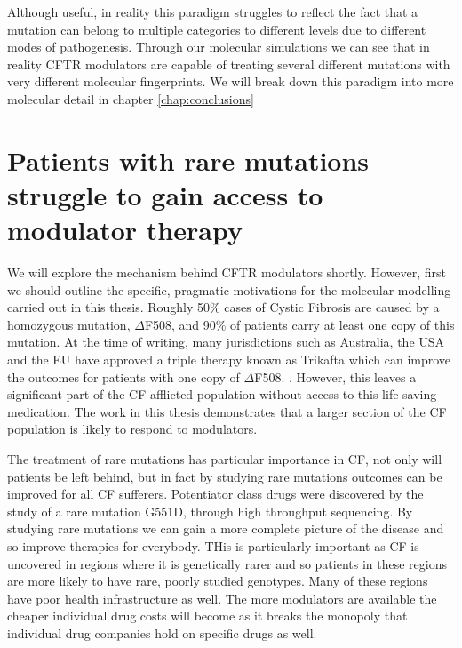 Although useful, in reality this paradigm struggles to reflect the fact that a mutation can belong to multiple categories to different levels due to different modes of pathogenesis. Through our molecular simulations we can see that in reality CFTR modulators are capable of treating several different mutations with very different molecular fingerprints. We will break down this paradigm into more molecular detail in chapter \ref{chap:conclusions}


\section{Patients with rare mutations struggle to gain access to modulator therapy}
We will explore the mechanism behind CFTR modulators shortly. However, first we should outline the specific, pragmatic motivations for the molecular modelling carried out in this thesis. Roughly 50\% cases of Cystic Fibrosis are caused by a homozygous mutation, $\Delta$F508, and 90\% of patients carry at least one copy of this mutation. At the time of writing, many jurisdictions such as Australia, the USA and the EU have approved a triple therapy known as Trikafta which can improve the outcomes for patients with one copy of $\Delta$F508. . However, this leaves a significant part of the CF afflicted population without access to this life saving medication. The work in this thesis demonstrates that a larger section of the CF population is likely to respond to modulators.

The treatment of rare mutations has particular importance in CF, not only will patients be left behind, but in fact by studying rare mutations outcomes can be improved for all CF sufferers. Potentiator class drugs were discovered by the study of a rare mutation G551D, through high throughput sequencing. By studying rare mutations we can gain a more complete picture of the disease and so improve therapies for everybody. THis is particularly important as CF is uncovered in regions where it is genetically rarer and so patients in these regions are more likely to have rare, poorly studied genotypes. Many of these regions have poor health infrastructure as well. The more modulators are available the cheaper individual drug costs will become as it breaks the monopoly that individual drug companies hold on specific drugs as well.

